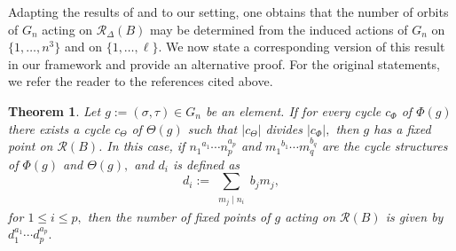 \documentclass[12pt]{article}
\newtheorem{theorem}{Theorem}[section]
\theoremstyle{definition}
\theoremstyle{remark}
\begin{document}
Adapting the results of \cite{MR1577579} and \cite{MR18142} to our setting, one obtains that the number of orbits of $G_n$ acting on $\mathcal{R}_\Delta(B)$ may be determined from the induced actions of $G_n$ on $\{1,\ldots,n^3\}$ and on $\{1,\ldots,\ell\}$.
We now state a corresponding version of this result in our framework and provide an alternative proof. For the original statements, we refer the reader to the references cited above.
\begin{theorem}\label{thm:brujin}
Let $g:=(\sigma,\tau)\in G_n$ be an element. If for every cycle $c_\Phi$ of $\Phi(g)$ there exists a cycle $c_\Theta$ of $\Theta(g)$ such that $\vert c_\Theta\vert$ divides $ \vert c_\Phi\vert,$ then $g$ has a fixed point on $\mathcal{R}(B)$.
In this case, if ${n_1}^{a_1}\cdots n_p^{a_p}$ and ${m_1}^{b_1}\cdots m_q^{b_q}$ are the cycle structures of $\Phi(g)$ and $\Theta(g),$ and $d_i$ is defined as
$$d_i:=\sum_{\substack{ m_j\mid n_i}} b_jm_j, $$
for $1\leq i \leq p,$
then the number of fixed points of $g$ acting on $\mathcal{R}(B)$ is given by $d_1
^{a_1}\cdots d_p^{a_p}.$
\end{theorem}
\end{document}
